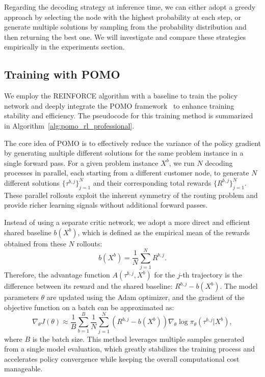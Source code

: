 \documentclass[pdflatex,sn-basic,Numbered]{sn-jnl}
\begin{document}
Regarding the decoding strategy at inference time, we can either adopt a greedy approach by selecting the node with the highest probability at each step, or generate multiple solutions by sampling from the probability distribution and then returning the best one. We will investigate and compare these strategies empirically in the experiments section.

\subsection{Training with POMO}
We employ the REINFORCE algorithm with a baseline to train the policy network and deeply integrate the POMO framework~\cite{kwon2020pomo} to enhance training stability and efficiency. The pseudocode for this training method is summarized in Algorithm~\ref{alg:pomo_rl_professional}.

The core idea of POMO is to effectively reduce the variance of the policy gradient by generating multiple different solutions for the same problem instance in a single forward pass. For a given problem instance $X^b$, we run $N$ decoding processes in parallel, each starting from a different customer node, to generate $N$ different solutions $\{\tau^{b,j}\}_{j=1}^N$ and their corresponding total rewards $\{R^{b,j}\}_{j=1}^N$. These parallel rollouts exploit the inherent symmetry of the routing problem and provide richer learning signals without additional forward passes.

Instead of using a separate critic network, we adopt a more direct and efficient shared baseline $b(X^b)$, which is defined as the empirical mean of the rewards obtained from these $N$ rollouts:
\begin{equation}
    b(X^b) = \frac{1}{N} \sum_{j=1}^{N} R^{b,j}.
\end{equation}
Therefore, the advantage function $A(\tau^{b,j}, X^b)$ for the $j$-th trajectory is the difference between its reward and the shared baseline: $R^{b,j} - b(X^b)$. The model parameters $\theta$ are updated using the Adam optimizer, and the gradient of the objective function on a batch can be approximated as:
\begin{equation}
    \nabla_{\theta} J(\theta) \approx \frac{1}{B} \sum_{b=1}^{B} \frac{1}{N} \sum_{j=1}^{N} (R^{b,j} - b(X^b)) \nabla_{\theta} \log \pi_{\theta}(\tau^{b,j}|X^b),
\end{equation}
where $B$ is the batch size. This method leverages multiple samples generated from a single model evaluation, which greatly stabilizes the training process and accelerates policy convergence while keeping the overall computational cost manageable.
\end{document}
